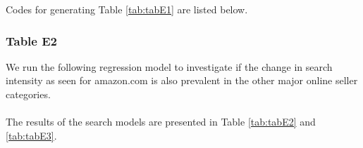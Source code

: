 \documentclass{article}
\begin{document}
Codes for generating Table \ref{tab:tabE1} are listed below.

\pagebreak

\subsubsection{Table E2}
We run the following regression model to investigate if the change in search intensity as seen for amazon.com is also prevalent in the other major online seller categories.\\
\\
The results of the search models are presented in Table \ref{tab:tabE2} and \ref{tab:tabE3}.
\end{document}
